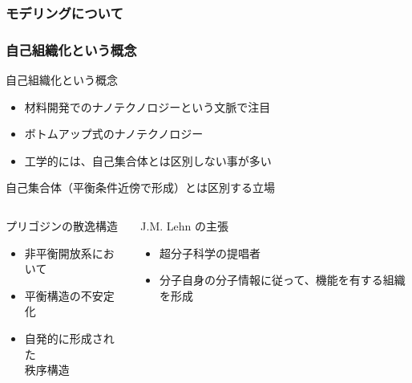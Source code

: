 \documentclass[12pt, dvipdfmx]{beamer}
\begin{document}
\begin{frame}
    \frametitle{モデリングについて}

    

\end{frame}
\begin{frame}
    \frametitle{自己組織化という概念}
    \begin{block}{自己組織化という概念}
        \begin{itemize}
            \item 材料開発でのナノテクノロジーという文脈で注目
            \item ボトムアップ式のナノテクノロジー
            \item 工学的には、自己集合体とは区別しない事が多い
        \end{itemize}
    \end{block}

    \begin{exampleblock}{自己集合体（平衡条件近傍で形成）とは区別する立場}
        \begin{columns}[T, onlytextwidth]
            \begin{alertblock}{プリゴジンの散逸構造}
                \begin{itemize}
                    \item 非平衡開放系において
                    \item 平衡構造の不安定化
                    \item 自発的に形成された\\秩序構造
                \end{itemize}
            \end{alertblock}
            \begin{alertblock}{J.M. Lehn の主張}
                \begin{itemize}
                    \item 超分子科学の提唱者
                    \item 分子自身の分子情報に従って、機能を有する組織を形成
                \end{itemize}
            \end{alertblock}
        \end{columns}
    \end{exampleblock}
\end{frame}
\end{document}

